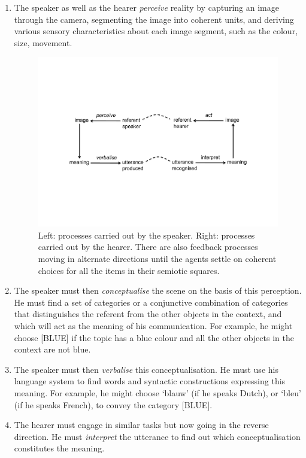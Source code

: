 \begin{enumerate}
\item The speaker as well as the hearer {\itshape perceive} reality
by capturing an image through the camera, segmenting 
the image into coherent units, and deriving various 
sensory characteristics about each image segment, 
such as the colour, size, movement. 

\begin{figure}[htbp]
  \centerline{\includegraphics[width=.85\textwidth]{chap2/figs/triangle2}}
\caption{\label{triangle2a} Left: processes carried
out by the speaker. Right: processes carried out by the hearer.
There are also feedback processes moving in alternate directions
until the agents settle on coherent choices for all the items
in their semiotic squares.}
\end{figure}

\item The speaker must then {\itshape conceptualise} the 
scene on the basis of this perception. He must find a set of
categories or a conjunctive combination of 
categories that distinguishes the referent from the other objects in 
the context, and which will act as the meaning of 
his communication. For example, he might choose [BLUE] if the
topic has a blue colour and all the other objects in the 
context are not blue. 

\item The speaker must then {\itshape verbalise} this conceptualisation. 
He must use his language system to find words and 
syntactic constructions expressing this meaning.
For example, he might choose `blauw' (if he speaks
Dutch), or `bleu' (if he speaks French),
to convey the category [BLUE]. 

\item The hearer must engage in similar tasks but now
going in the reverse direction. He must
{\itshape interpret} the utterance to find out which
conceptualisation constitutes the meaning. 


\end{enumerate}
